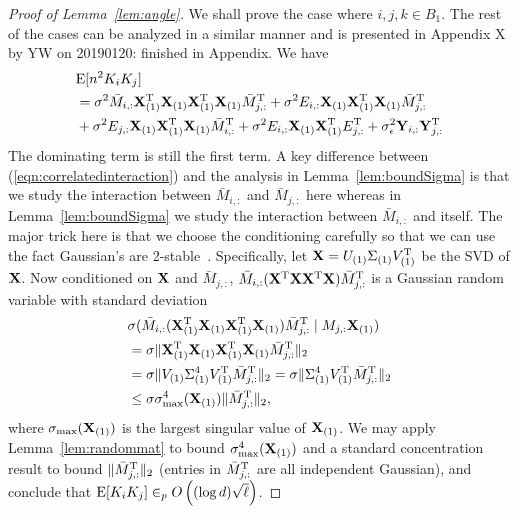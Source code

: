 \begin{proof}[Proof of Lemma~\ref{lem:angle}]
 We shall prove the case where $i, j, k \in B_1$. The rest of the cases can be analyzed in a similar manner and is presented in {\color{red} Appendix X} {\color{blue}by YW on 20190120: finished in Appendix}. We have 
 {\small
\begin{equation}
\begin{split}
    & \mathrm{E}[n^2 K_i K_j] \\
    &=  \sigma^2 \bar M_{i, :}\mathbf{X}_{(1)}^{\mathrm{T}}\mathbf{X}_{(1)}\mathbf{X}_{(1)}^{\mathrm{T}}\mathbf{X}_{(1)}\bar M^{\mathrm{T}}_{j, :}   + \sigma^2E_{i,:}\mathbf{X}_{(1)}\mathbf{X}^{\mathrm{T}}_{(1)}\mathbf{X}_{(1)}\bar M^{\mathrm{T}}_{j,:}  \\
    &+ \sigma^2E_{j,:}\mathbf{X}_{(1)}\mathbf{X}^{\mathrm{T}}_{(1)}\mathbf{X}_{(1)}\bar M^{\mathrm{T}}_{i,:}
    +\sigma^2 E_{i,:}\mathbf{X}_{(1)} \mathbf{X}_{(1)}^{\mathrm{T}} E^{\mathrm{T}}_{j,:} + \sigma^2_{\epsilon}\mathbf{Y}_{i,:}\mathbf{Y}^{\mathrm{T}}_{j,:}
\end{split}
\label{eqn:correlatedinteraction}
\end{equation}
}
The dominating term is still the first term. A key difference between (\ref{eqn:correlatedinteraction}) and the analysis in Lemma~\ref{lem:boundSigma} is that we study the interaction between $\bar M_{i, :}$ and $\bar M_{j, :}$ here whereas in Lemma~\ref{lem:boundSigma} we study the interaction between $\bar M_{i, :}$ and itself. The major trick here is that we choose the conditioning carefully so that we can use the fact Gaussian's are 2-stable~\cite{indyk2000stable}. Specifically, let $\mathbf{X} = U_{(1)}\Sigma_{(1)}V^{\mathrm{T}}_{(1)}$ be the SVD of $\mathbf{X}$. Now conditioned on $\mathbf{X}$ and $\bar M_{j, :}$, $\bar M_{i,:}(\mathbf{X}^{\mathrm{T}}\mathbf{X} \mathbf{X}^{\mathrm{T}} \mathbf{X}) \bar M^{\mathrm{T}}_{j, :}$ is a Gaussian random variable with standard deviation
\begin{equation}
\begin{split}   \label{eqn:temp2}
    & \sigma(\bar M_{i,:}(\mathbf{X}_{(1)}^{\mathrm{T}}\mathbf{X}_{(1)}\mathbf{X}_{(1)}^{\mathrm{T}}\mathbf{X}_{(1)})\bar M^{\mathrm{T}}_{j, :} \mid M_{j, :} \mathbf{X}_{(1)}) \\
    &= \sigma \|\mathbf{X}_{(1)}^{\mathrm{T}}\mathbf{X}_{(1)}\mathbf{X}_{(1)}^{\mathrm{T}}\mathbf{X}_{(1)}\bar M^{\mathrm{T}}_{j,:}\|_2   \\ 
    &= \sigma \|V_{(1)}\Sigma^4_{(1)}V_{(1)}^{\mathrm{T}}\bar M^{\mathrm{T}}_{j,:}\|_2 = \sigma \|\Sigma^4_{(1)}V_{(1)}^{\mathrm{T}}\bar M^{\mathrm{T}}_{j,:}\|_2  \\
    & \leq \sigma \sigma_{\max}^4(\mathbf{X}_{(1)})\|\bar M^{\mathrm{T}}_{j,:}\|_2,
\end{split}
\end{equation}
where $\sigma_{\max}(\mathbf{X}_{(1)})$ is the largest singular value of $\mathbf{X}_{(1)}$. 
We may apply Lemma~\ref{lem:randommat} to bound $\sigma_{\max}^4(\mathbf{X}_{(1)})$ and a standard concentration result to bound $\|\bar M^{\mathrm{T}}_{j,:}\|_2$ (entries in $\bar M^{\mathrm{T}}_{j,:}$ are all independent Gaussian), and conclude that $\mathrm{E}[K_i K_j] \in_p O\left( (\log d) \sqrt{\ell} \right)$. 
\end{proof}


